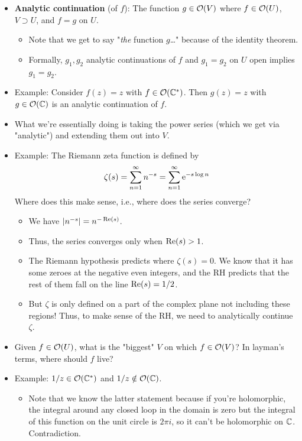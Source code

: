 \documentclass[../notes.tex]{subfiles}
\begin{document}
\begin{itemize}
\begin{itemize}
    \end{itemize}
    \item \textbf{Analytic continuation} (of $f$): The function $g\in\mO(V)$ where $f\in\mO(U)$, $V\supset U$, and $f=g$ on $U$.
    \begin{itemize}
        \item Note that we get to say "\emph{the} function $g$\dots" because of the identity theorem.
        \item Formally, $g_1,g_2$ analytic continuations of $f$ and $g_1=g_2$ on $U$ open implies $g_1=g_2$.
    \end{itemize}
    \item Example: Consider $f(z)=z$ with $f\in\mO(\C^*)$. Then $g(z)=z$ with $g\in\mO(\C)$ is an analytic continuation of $f$.
    \item What we're essentially doing is taking the power series (which we get via "analytic") and extending them out into $V$.
    \item Example: The Riemann zeta function is defined by
    \begin{equation*}
        \zeta(s) = \sum_{n=1}^\infty n^{-s}
        = \sum_{n=1}^\infty\e[-s\log n]
    \end{equation*}
    Where does this make sense, i.e., where does the series converge?
    \begin{itemize}
        \item We have $|n^{-s}|=n^{-\re(s)}$.
        \item Thus, the series converges only when $\re(s)>1$.
        \item The Riemann hypothesis predicts where $\zeta(s)=0$. We know that it has some zeroes at the negative even integers, and the RH predicts that the rest of them fall on the line $\re(s)=1/2$.
        \item But $\zeta$ is only defined on a part of the complex plane not including these regions! Thus, to make sense of the RH, we need to analytically continue $\zeta$.
    \end{itemize}
    \item Given $f\in\mO(U)$, what is the "biggest" $V$ on which $f\in\mO(V)$? In layman's terms, where should $f$ live?
    \item Example: $1/z\in\mO(\C^*)$ and $1/z\notin\mO(\C)$.
    \begin{itemize}
        \item Note that we know the latter statement because if you're holomorphic, the integral around any closed loop in the domain is zero but the integral of this function on the unit circle is $2\pi i$, so it can't be holomorphic on $\C$. Contradiction.

\end{itemize}
\end{itemize}
\end{document}
